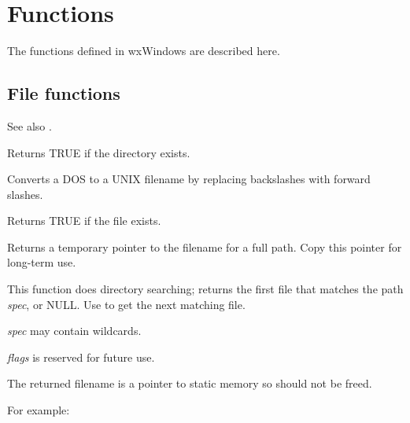 \chapter{Functions}\label{functions}
%
\setfooter{\thepage}{}{}{}{}{\thepage}

The functions defined in wxWindows are described here.

\section{File functions}\label{filefunctions}

See also .



Returns TRUE if the directory exists.



Converts a DOS to a UNIX filename by replacing backslashes with forward
slashes.



Returns TRUE if the file exists.



Returns a temporary pointer to the filename for a full path.
Copy this pointer for long-term use.

\label{wxfindfirstfile}


This function does directory searching; returns the first file
that matches the path {\it spec}, or NULL. Use  to
get the next matching file.

{\it spec} may contain wildcards.

{\it flags} is reserved for future use.

The returned filename is a pointer to static memory so should
not be freed.

For example:

